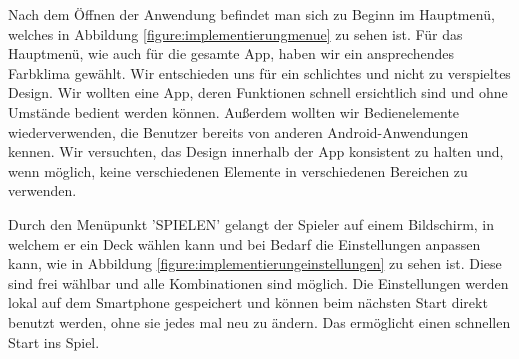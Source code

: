 Nach dem Öffnen der Anwendung befindet man sich zu Beginn im Hauptmenü, welches in Abbildung \ref{figure:implementierungmenue} zu sehen ist. Für das Hauptmenü, wie auch für die gesamte App, haben wir ein ansprechendes Farbklima gewählt. Wir entschieden uns für ein schlichtes und nicht zu verspieltes Design. Wir wollten eine App, deren Funktionen schnell ersichtlich sind und ohne Umstände bedient werden können. Außerdem wollten wir Bedienelemente wiederverwenden, die Benutzer bereits von anderen Android-Anwendungen kennen. Wir versuchten, das Design innerhalb der App konsistent zu halten und, wenn möglich, keine verschiedenen Elemente in verschiedenen Bereichen zu verwenden.

Durch den Menüpunkt 'SPIELEN' gelangt der Spieler auf einem Bildschirm, in welchem er ein Deck wählen kann und bei Bedarf die Einstellungen anpassen kann, wie in Abbildung \ref{figure:implementierungeinstellungen} zu sehen ist. Diese sind frei wählbar und alle Kombinationen sind möglich. Die Einstellungen werden lokal auf dem Smartphone gespeichert und können beim nächsten Start direkt benutzt werden, ohne sie jedes mal neu zu ändern. Das ermöglicht einen schnellen Start ins Spiel.\\

